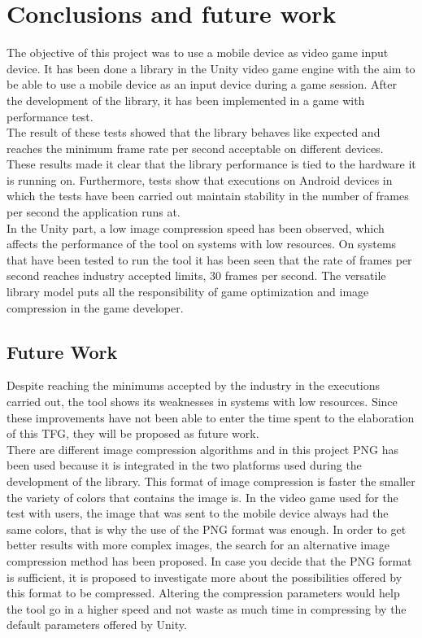 
\chapter{Conclusions and future work}
\label{cap7}
\label{cap:conclusions}

The objective of this project was to use a mobile device as video game input device. It has been done a library in the Unity video game engine with the aim to be able to use a mobile device as an input device during a game session. After the development of the library, it has been implemented in a game with performance test.\\


The result of these tests showed that the library behaves like expected and reaches the minimum frame rate per second acceptable on different devices. These results made it clear that the library performance is tied to the hardware it is running on. Furthermore, tests show that executions on Android devices in which the tests have been carried out maintain stability in the number of frames per second the application runs at.\\


In the Unity part, a low image compression speed has been observed, which affects the performance of the tool on systems with low resources. On systems that have been tested to run the tool it has been seen that the rate of frames per second reaches industry accepted limits, 30 frames per second. The versatile library model puts all the responsibility of game optimization and image compression in the game developer.\\

\section{Future Work}

Despite reaching the minimums accepted by the industry in the executions carried out, the tool shows its weaknesses in systems with low resources. Since these improvements have not been able to enter the time spent to the elaboration of this TFG, they will be proposed as future work.\\


There are different image compression algorithms and in this project PNG has been used because it is integrated in the two platforms used during the development of the library. This format of image compression is faster the smaller the variety of colors that contains the image is. In the video game used for the test with users, the image that was sent to the mobile device always had the same colors, that is why the use of the PNG format was enough. In order to get better results with more complex images, the search for an alternative image compression method has been proposed. In case you decide that the PNG format is sufficient, it is proposed to investigate more about the possibilities offered by this format to be compressed. Altering the compression parameters would help the tool go in a higher speed and not waste as much time in compressing by the default parameters offered by Unity.\\


